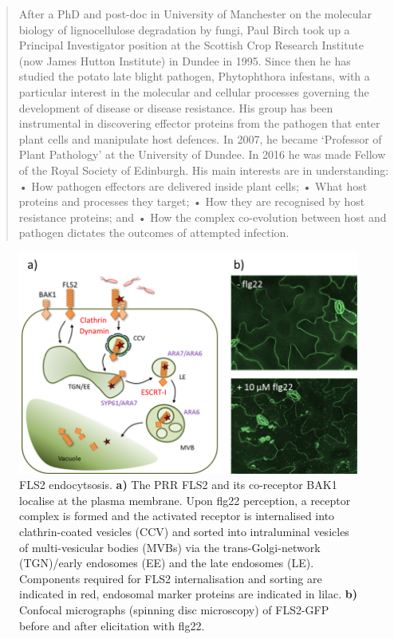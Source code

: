 \documentclass[12pt,]{book}
\theoremstyle{definition}
\theoremstyle{definition}
\theoremstyle{remark}
\begin{document}
\begin{quote}
After a PhD and post-doc in University of Manchester on the molecular
biology of lignocellulose degradation by fungi, Paul Birch took up a
Principal Investigator position at the Scottish Crop Research Institute
(now James Hutton Institute) in Dundee in 1995. Since then he has
studied the potato late blight pathogen, Phytophthora infestans, with a
particular interest in the molecular and cellular processes governing
the development of disease or disease resistance. His group has been
instrumental in discovering effector proteins from the pathogen that
enter plant cells and manipulate host defences. In 2007, he became
`Professor of Plant Pathology' at the University of Dundee. In 2016 he
was made Fellow of the Royal Society of Edinburgh. His main interests
are in understanding: • How pathogen effectors are delivered inside
plant cells; • What host proteins and processes they target; • How they
are recognised by host resistance proteins; and • How the complex
co-evolution between host and pathogen dictates the outcomes of
attempted infection.
\end{quote}












\begin{figure}
\includegraphics[width=4.9in]{assets/sr_fig1_prac} \caption{FLS2 endocytsosis. \textbf{a)} The PRR FLS2 and its
co-receptor BAK1 localise at the plasma membrane. Upon flg22 perception,
a receptor complex is formed and the activated receptor is internalised
into clathrin-coated vesicles (CCV) and sorted into intraluminal
vesicles of multi-vesicular bodies (MVBs) via the trans-Golgi-network
(TGN)/early endosomes (EE) and the late endosomes (LE). Components
required for FLS2 internalisation and sorting are indicated in red,
endosomal marker proteins are indicated in lilac. \textbf{b)} Confocal
micrographs (spinning disc microscopy) of FLS2-GFP before and after
elicitation with flg22.}\label{fig:srfig}
\end{figure}
\end{document}
